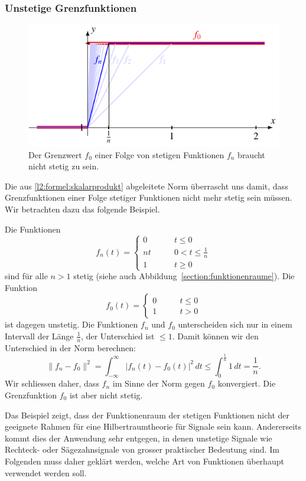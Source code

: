 \subsubsection{Unstetige Grenzfunktionen}
\begin{figure}
\centering
\includegraphics{chapters/2-fourier/images/lim.pdf}
\caption{Der Grenzwert $f_0$ einer Folge von stetigen Funktionen $f_n$
braucht nicht stetig zu sein.
\label{fourier:grenzwertunstetig}}
\end{figure}
Die aus \eqref{l2:formel:skalarprodukt} abgeleitete Norm überrascht uns
damit, dass Grenzfunktionen einer Folge stetiger Funktionen nicht mehr
stetig sein müssen.
Wir betrachten dazu das folgende Beispiel.

\begin{beispiel}
Die Funktionen
\[
f_n(t)
=
\begin{cases}
0&\qquad t\le 0\\
nt&\qquad 0<t\le \frac1n\\
1&\qquad t\ge 0
\end{cases}
\]
sind für alle $n>1$ stetig (siehe auch
Abbildung~\ref{section:funktionenraume}).
Die Funktion
\[
f_0(t) = \begin{cases}
0&\qquad t \le 0\\
1&\qquad t>0
\end{cases}
\]
ist dagegen unstetig.
Die Funktionen $f_n$ und $f_0$ unterscheiden sich nur in einem Intervall
der Länge $\frac1n$, der Unterschied ist $\le 1$.
Damit können wir den Unterschied in der Norm berechnen:
\[
\| f_n - f_0 \|^2
=
\int_{-\infty}^{\infty}
|f_n(t)-f_0(t)|^2
\,dt
\le
\int_0^{\frac1n} 1\,dt
=
\frac1n.
\]
Wir schliessen daher, dass $f_n$ im Sinne der Norm gegen $f_0$ konvergiert.
Die Grenzfunktion $f_0$ ist aber nicht stetig.
\end{beispiel}

Das Beispiel zeigt, dass der Funktionenraum der stetigen Funktionen nicht
der geeignete Rahmen für eine Hilbertraumtheorie für Signale sein kann.
Andererseits kommt dies der Anwendung sehr entgegen, in denen unstetige
Signale wie Rechteck- oder Sägezahnsignale von grosser praktischer
Bedeutung sind.
Im Folgenden muss daher geklärt werden, welche Art von Funktionen überhaupt
verwendet werden soll.

